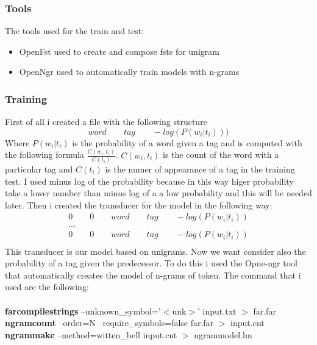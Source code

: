 \documentclass[a4paper,8pt,oneside]{article}
\begin{document}
		\subsubsection{Tools}
			The tools used for the train and test:
			\begin{itemize}
				\item OpenFst used to create and compose fsts for unigram
				\item OpenNgr used to automatically train models with n-grams
			\end{itemize}
		\subsubsection{Training}
			First of all i created a file with the following structure
			\begin{equation}
				word \qquad tag \qquad -log(P(w_i|t_i)))
			\end{equation}
			Where $P(w_i|t_i)$ is the probability of a word given a tag and is computed with the following formula $\frac{C(w_i,t_i)}{C(t_i)}$. $C(w_i,t_i)$ is the count of the word with a particular tag and $C(t_i)$ is the numer of appearance of a tag in the training test. I used minus log of the probability because in this way higer probability take a lower number than minus log of a  a low probability and this will be needed later. Then i created the transducer for the model in the following way:
			\begin{gather*}
					0 \qquad 0 \qquad word \qquad tag \qquad -log(P(w_i|t_i)) \\
					... \\
					0 \qquad 0 \qquad word \qquad tag \qquad -log(P(w_i|t_i)) \\
			\end{gather*}
			This transducer is our model based on unigrams. Now we want consider also the probability of a tag given the predecessor. To do this i used the Opne-ngr tool that automatically creates the model of n-grams of token. The command that i used are the following:\\ \\

			\textbf{farcompilestrings} --unknown\_symbol='$<$unk$>$' input.txt $>$ far.far \\
			\textbf{ngramcount} --order=N --require\_symbols=false far.far $>$ input.cnt \\
			\textbf{ngrammake} --method=witten\_bell input.cnt $>$ ngrammodel.lm \\ \\
\end{document}
